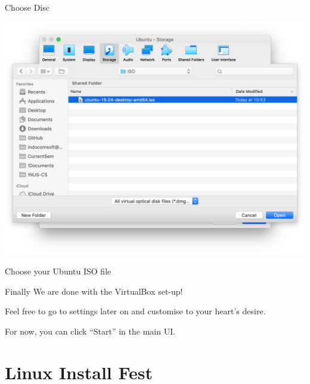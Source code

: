 \documentclass[11pt]{beamer}
\begin{document}
\begin{frame}{Choose Disc}
  \begin{center}
    \includegraphics[width=0.7\linewidth]{vb-disc}
  \end{center}
  Choose your Ubuntu ISO file
\end{frame}

\begin{frame}{Finally}
  We are done with the VirtualBox set-up!

  Feel free to go to settings later on and customise to your heart's desire.

  For now, you can click ``Start'' in the main UI.
\end{frame}

\section{Linux Install Fest}
\subsection{}
\end{document}
